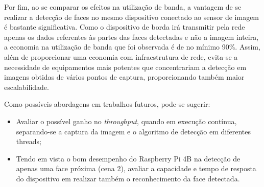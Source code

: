 Por fim, ao se comparar os efeitos na utilização de banda, a vantagem de se realizar a detecção de faces no mesmo dispositivo conectado ao sensor de imagem é bastante significativa. Como o dispositivo de borda irá transmitir pela rede apenas os dados referentes às partes das faces detectadas e não a imagem inteira, a economia na utilização de banda que foi observada é de no mínimo 90\%. Assim, além de proporcionar uma economia com infraestrutura de rede, evita-se a necessidade de equipamentos mais potentes que concentrariam a detecção em imagens obtidas de vários pontos de captura, proporcionando também maior escalabilidade.

Como possíveis abordagens em trabalhos futuros, pode-se sugerir:
\begin{itemize}
    \item Avaliar o possível ganho no \textit{throughput}, quando em execução contínua, separando-se a captura da imagem e o algoritmo de detecção em diferentes threads;
    \item Tendo em vista o bom desempenho do Raspberry Pi 4B na detecção de apenas uma face próxima (cena 2), avaliar a capacidade e tempo de resposta do dispositivo em realizar também o reconhecimento da face detectada.
\end{itemize}